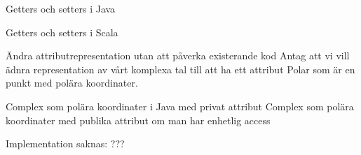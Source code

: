 
\begin{Slide}{Getters och setters i Java}
\end{Slide}

\begin{Slide}{Getters och setters i Scala}
\end{Slide}

\begin{Slide}{Ändra attributrepresentation utan att påverka existerande kod}
Antag att vi vill ädnra representation av vårt komplexa tal till att ha ett attribut Polar som är en  punkt med polära koordinater.
 
Complex som polära koordinater i Java med privat attribut
Complex som polära koordinater med publika attribut om man har enhetlig access
\end{Slide}



\begin{Slide}{Implementation saknas: ???}
\end{Slide}


\fi

